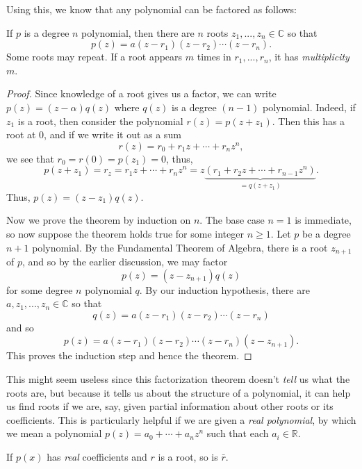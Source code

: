 \documentclass[11pt,dvipsnames]{book}
\numberwithin{equation}{section} %
\numberwithin{figure}{section} %
\numberwithin{table}{section} %
\begin{document}
Using this, we know that any polynomial can be factored as follows:

\begin{theorem}
If $p$ is a degree $n$ polynomial, then there are $n$ roots $z_{1},...,z_{n}\in\mathbb{C}$ so that 
\[
p(z) = a(z-r_{1})(z-r_{2})\cdots (z-r_{n}).\]
Some roots may repeat. If a root appears $m$ times in $r_{1},...,r_{n}$, it has {\it multiplicity} $m$. 
\end{theorem}



\begin{proof}
Since knowledge of a root gives us a factor, we can write $p(z)=(z-\alpha)q(z)$ where $q(z)$ is a degree $(n-1)$ polynomial. Indeed, if $z_1$ is a root, then consider the polynomial $r(z)=p(z+z_1)$. Then this has a root at $0$,  and if we write it out as a sum 
\[
r(z)= r_{0}+r_{1}z+\cdots + r_{n}z^{n},
\]
we see that $r_{0}=r(0)=p(z_1)=0$, thus,
\[
p(z+z_{1})=r_{z} = r_{1}z+\cdots + r_{n}z^{n} = z\underbrace{(r_{1}+r_{2}z+\cdots + r_{n-1}z^{n})}_{=q(z+z_{1})}.
\]
Thus, $p(z)=(z-z_{1})q(z)$. 

Now we prove the theorem by induction on $n$. The base case $n=1$ is immediate, so now suppose the theorem holds true for some integer $n\geq 1$. Let $p$ be a degree $n+1$ polynomial. By the Fundamental Theorem of Algebra, there is a root $z_{n+1}$ of $p$, and so by the earlier discussion, we may factor
\[
p(z) = (z-z_{n+1})q(z)\]
for some degree $n$ polynomial $q$. By our induction hypothesis, there are $a,z_{1},...,z_{n}\in\mathbb{C}$ so that 
\[
q(z) = a(z-r_{1})(z-r_{2})\cdots (z-r_{n})\]
and so
\[
p(z) = a(z-r_{1})(z-r_{2})\cdots (z-r_{n}) (z-z_{n+1}).
\]
This proves the induction step and hence the theorem.



\end{proof}

 
This might seem useless since this factorization theorem doesn't {\it tell} us what the roots are, but because it tells us about the structure of a polynomial, it can help us find roots if we are, say, given partial information about other roots or its coefficients. This is particularly helpful if we are given a {\it real polynomial}, by which we mean a polynomial $p(z)=a_{0}+\cdots + a_{n}z^{n}$ such that each $a_i \in \mathbb{R}$.


\begin{theorem} If $p(x)$ has {\it real} coefficients and $r$ is a root, so is $\bar{r}$. 
\end{theorem}
\end{document}
